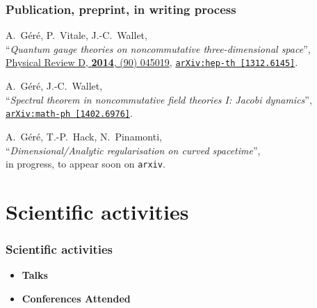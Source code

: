 \documentclass[9pt]{beamer}
\newcommand{\titleref}[1]{``\emph{#1}''}
\newcommand*{\doi}[1]{http://dx.doi.org/#1}
\newcommand{\PhysRevD}[4]{\href{\doi{#4}}{Physical Review D, \textbf{#1}, (#3) #2}}
\newcommand{\arxiv}[3]{\href{#3}{\texttt{arXiv:#1 [#2]}}}
\begin{document}
\begin{frame}

\frametitle{Publication, preprint, in writing process}

A.~Géré, P.~Vitale, J.-C.~Wallet, \\
\titleref{Quantum gauge theories on noncommutative three-dimensional space}, \\
\PhysRevD{2014}{045019}{90}{10.1103/PhysRevD.90.045019},
\arxiv{hep-th}{1312.6145}{http://arxiv.org/abs/1312.6145}.\par
%
\bigskip
%
A.~Géré, J.-C.~Wallet, \\
\titleref{Spectral theorem in noncommutative field theories I: Jacobi dynamics}, \\
\arxiv{math-ph}{1402.6976}{http://arxiv.org/abs/1402.6976}.\par%
%
\bigskip
%
A.~Géré, T.-P.~Hack, N.~Pinamonti, \\
\titleref{Dimensional/Analytic regularisation on curved spacetime}, \\
in progress, to appear soon on \texttt{arxiv}.

\end{frame}  

\section[Conf.]{Scientific activities}

\begin{frame}
%
%
%
%
\frametitle{Scientific activities}
%
%
\begin{itemize}
% 
\item \textbf{Talks}
%
%
%
%
\item \textbf{Conferences Attended} \ 
%
%
%
%
\end{itemize}
%
%
%
%
\end{frame}  

\end{document}
